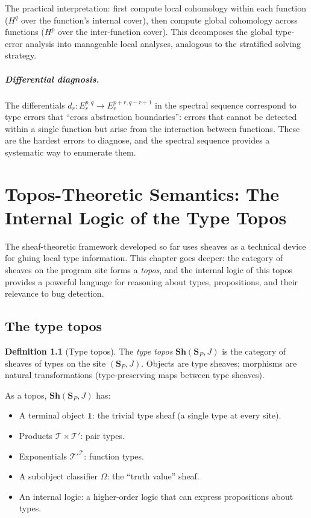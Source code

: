 \documentclass[11pt]{report}
\theoremstyle{definition}
\newtheorem{definition}{Definition}[section]
\theoremstyle{plain}
\begin{document}
The practical interpretation: first compute local cohomology within each
function ($H^q$ over the function's internal cover), then compute global
cohomology across functions ($H^p$ over the inter-function cover). This
decomposes the global type-error analysis into manageable local analyses,
analogous to the stratified solving strategy.

\paragraph{Differential diagnosis.}
The differentials $d_r : E_r^{p,q} \to E_r^{p+r, q-r+1}$ in the spectral
sequence correspond to type errors that ``cross abstraction boundaries'':
errors that cannot be detected within a single function but arise from the
interaction between functions. These are the hardest errors to diagnose, and
the spectral sequence provides a systematic way to enumerate them.

\chapter{Topos-Theoretic Semantics: The Internal Logic of the Type Topos}

The sheaf-theoretic framework developed so far uses sheaves as a technical
device for gluing local type information. This chapter goes deeper: the
category of sheaves on the program site forms a \emph{topos}, and the
internal logic of this topos provides a powerful language for reasoning about
types, propositions, and their relevance to bug detection.

\section{The type topos}

\begin{definition}[Type topos]
The \emph{type topos} $\mathbf{Sh}(\mathbf{S}_P, J)$ is the category of
sheaves of types on the site $(\mathbf{S}_P, J)$. Objects are type sheaves;
morphisms are natural transformations (type-preserving maps between type
sheaves).
\end{definition}

As a topos, $\mathbf{Sh}(\mathbf{S}_P, J)$ has:
\begin{itemize}[nosep]
  \item A terminal object $\mathbf{1}$: the trivial type sheaf (a single
        type at every site).
  \item Products $\mathcal{T} \times \mathcal{T}'$: pair types.
  \item Exponentials $\mathcal{T}'^{\mathcal{T}}$: function types.
  \item A subobject classifier $\Omega$: the ``truth value'' sheaf.
  \item An internal logic: a higher-order logic that can express propositions
        about types.
\end{itemize}
\end{document}
